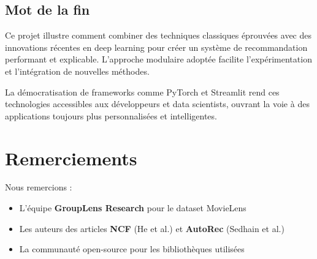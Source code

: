 \documentclass[12pt,a4paper]{article}
\begin{document}
\subsection{Mot de la fin}

Ce projet illustre comment combiner des techniques classiques éprouvées avec des innovations récentes en deep learning pour créer un système de recommandation performant et explicable. L'approche modulaire adoptée facilite l'expérimentation et l'intégration de nouvelles méthodes.

La démocratisation de frameworks comme PyTorch et Streamlit rend ces technologies accessibles aux développeurs et data scientists, ouvrant la voie à des applications toujours plus personnalisées et intelligentes.

\section*{Remerciements}

Nous remercions :
\begin{itemize}
    \item L'équipe \textbf{GroupLens Research} pour le dataset MovieLens
    \item Les auteurs des articles \textbf{NCF} (He et al.) et \textbf{AutoRec} (Sedhain et al.)
    \item La communauté open-source pour les bibliothèques utilisées
\end{itemize}
\end{document}
